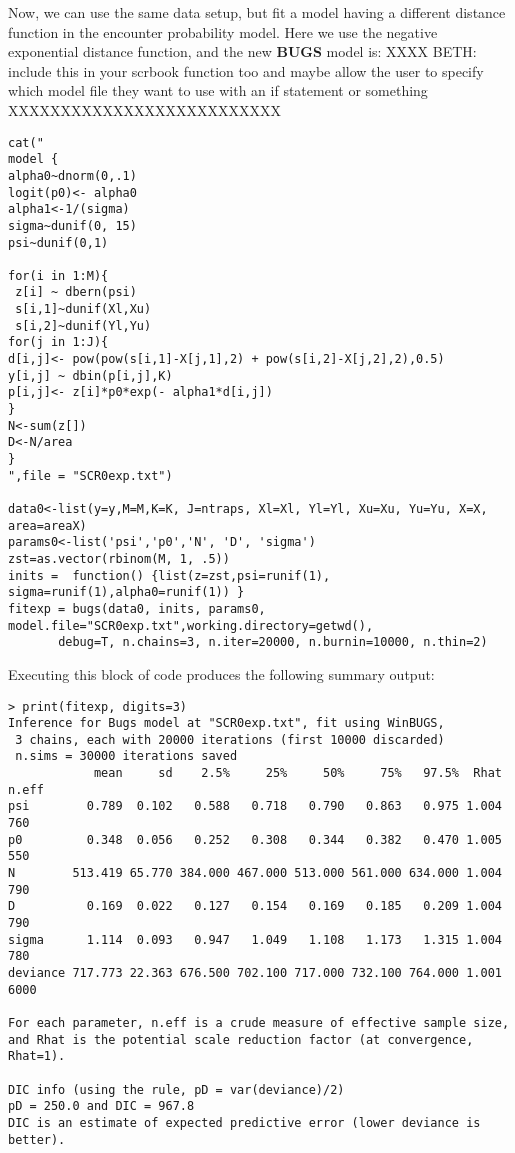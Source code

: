 Now, we can use the same data setup, but fit a model having a
different distance function in the encounter probability model. Here
we use the negative exponential distance function, and the new 
 {\bf BUGS} model is:  XXXX BETH: include this in your scrbook
 function too and maybe allow the user to specify which model file
 they want to use with an if statement or something XXXXXXXXXXXXXXXXXXXXXXXXXX
{\small
\begin{verbatim}
cat("
model {
alpha0~dnorm(0,.1)
logit(p0)<- alpha0
alpha1<-1/(sigma)
sigma~dunif(0, 15)
psi~dunif(0,1)

for(i in 1:M){
 z[i] ~ dbern(psi)
 s[i,1]~dunif(Xl,Xu)
 s[i,2]~dunif(Yl,Yu)
for(j in 1:J){
d[i,j]<- pow(pow(s[i,1]-X[j,1],2) + pow(s[i,2]-X[j,2],2),0.5)
y[i,j] ~ dbin(p[i,j],K)
p[i,j]<- z[i]*p0*exp(- alpha1*d[i,j])
}
N<-sum(z[])
D<-N/area
}
",file = "SCR0exp.txt")

data0<-list(y=y,M=M,K=K, J=ntraps, Xl=Xl, Yl=Yl, Xu=Xu, Yu=Yu, X=X, area=areaX)
params0<-list('psi','p0','N', 'D', 'sigma')
zst=as.vector(rbinom(M, 1, .5))
inits =  function() {list(z=zst,psi=runif(1), sigma=runif(1),alpha0=runif(1)) }
fitexp = bugs(data0, inits, params0, model.file="SCR0exp.txt",working.directory=getwd(),    
       debug=T, n.chains=3, n.iter=20000, n.burnin=10000, n.thin=2)
\end{verbatim}
}
Executing this block of code produces the following summary output:
{\small
\begin{verbatim}
> print(fitexp, digits=3)
Inference for Bugs model at "SCR0exp.txt", fit using WinBUGS,
 3 chains, each with 20000 iterations (first 10000 discarded)
 n.sims = 30000 iterations saved
            mean     sd    2.5%     25%     50%     75%   97.5%  Rhat n.eff
psi        0.789  0.102   0.588   0.718   0.790   0.863   0.975 1.004   760
p0         0.348  0.056   0.252   0.308   0.344   0.382   0.470 1.005   550
N        513.419 65.770 384.000 467.000 513.000 561.000 634.000 1.004   790
D          0.169  0.022   0.127   0.154   0.169   0.185   0.209 1.004   790
sigma      1.114  0.093   0.947   1.049   1.108   1.173   1.315 1.004   780
deviance 717.773 22.363 676.500 702.100 717.000 732.100 764.000 1.001  6000

For each parameter, n.eff is a crude measure of effective sample size,
and Rhat is the potential scale reduction factor (at convergence, Rhat=1).

DIC info (using the rule, pD = var(deviance)/2)
pD = 250.0 and DIC = 967.8
DIC is an estimate of expected predictive error (lower deviance is
better).
\end{verbatim}
}




